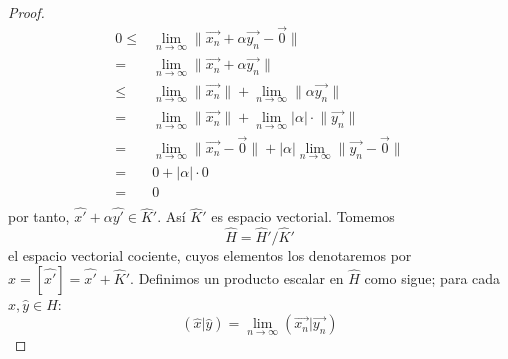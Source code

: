 \documentclass[12pt]{report}
\newcounter{it}
\theoremstyle{largebreak}
\newcommand\abs[1]{\ensuremath{\big|#1\big|}}
\newcommand\pint[2]{\ensuremath{\left(#1\big|#2\right)}}
\newcommand\norm[1]{\ensuremath{\|#1\|}}
\begin{document}
\begin{proof}
\begin{equation*}
            \begin{split}
                0\leq&\lim_{n\rightarrow\infty}\norm{\vec{x_n}+\alpha\vec{y_n}-\vec{0}}\\
                =&\lim_{n\rightarrow\infty}\norm{\vec{x_n}+\alpha\vec{y_n}}\\
                \leq&\lim_{n\rightarrow\infty}\norm{\vec{x_n}}+\lim_{n\rightarrow\infty}\norm{\alpha\vec{y_n}}\\
                =&\lim_{n\rightarrow\infty}\norm{\vec{x_n}}+\lim_{n\rightarrow\infty}\abs{\alpha}\cdot\norm{\vec{y_n}}\\
                =&\lim_{n\rightarrow\infty}\norm{\vec{x_n}-\vec{0}}+\abs{\alpha}\lim_{n\rightarrow\infty}\norm{\vec{y_n}-\vec{0}}\\
                =&0+\abs{\alpha}\cdot0\\
                =&0\\
            \end{split}
        \end{equation*}
        por tanto, $\hat{x'}+\alpha\hat{y'}\in\hat{K}'$. Así $\hat{K}'$ es espacio vectorial. Tomemos
        \begin{equation*}
            \hat{H}=\hat{H}'/\hat{K}'
        \end{equation*}
        el espacio vectorial cociente, cuyos elementos los denotaremos por $\hat{x}=[\hat{x'}]=\hat{x'}+\hat{K}'$. Definimos un producto escalar en $\hat{H}$ como sigue; para cada $\hat{x},\hat{y}\in H$:
        \begin{equation*}
            \pint{\hat{x}}{\hat{y}}=\lim_{n\rightarrow\infty }\pint{\vec{x_n}}{\vec{y_n}}
        \end{equation*}
    \end{proof}
\end{document}
